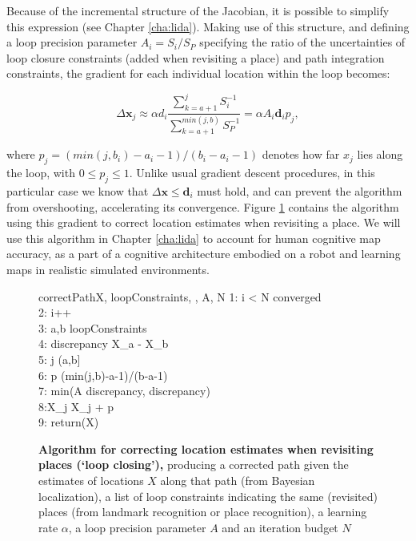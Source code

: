 Because of the incremental structure of the Jacobian, it is possible to simplify this expression (see Chapter \ref{cha:lida}). Making use of this structure, and defining a loop precision parameter $A_i=S_i/S_P$ specifying the ratio of the uncertainties of loop closure constraints (added when revisiting a place) and path integration constraints, the gradient for each individual location within the loop becomes:

\begin{equation}
\label{correction}
\Delta \bm x_j \approx \alpha d_i \frac{\sum_{k=a+1}^{j} S_i^{-1}}{\sum_{k=a+1}^{min(j,b)} S_P^{-1}} = \alpha A_i \bm d_i p_j,
\end{equation}

\noindent where $p_j=(min(j,b_i)-a_i-1)/(b_i-a_i-1)$ denotes how far $x_j$ lies along the loop, with $0 \leq p_j \leq 1$. Unlike usual gradient descent procedures, in this particular case we know that $\Delta \bm x \leq \bm d_i $ must hold, and can prevent the algorithm from overshooting, accelerating its convergence. Figure \ref{fig:sgdslam} contains the algorithm using this gradient to correct location estimates when revisiting a place. We will use this algorithm in Chapter \ref{cha:lida} to account for human cognitive map accuracy, as a part of a cognitive architecture embodied on a robot and learning maps in realistic simulated environments.

\begin{figure}[h]
	\begin{pseudocode}{correctPath}{X, loopConstraints, \alpha, A, N}
		1: \WHILE i < N \AND \NOT converged \\
		2: \quad i++ \\
		3: \quad \FOREACH a,b \in loopConstraints \\
		4: \quad \quad discrepancy \GETS X_a - X_b \\
		5: \quad \quad \FOREACH j \in (a,b] \\
		6: \quad \quad \quad p \GETS (min(j,b)-a-1)/(b-a-1) \\
		7: \quad \quad \quad \beta \GETS min(\alpha A \cdot discrepancy, discrepancy) \\
		8:\quad\quad\quad X_j \GETS X_j + \beta p \\
		9: return(X)
	\end{pseudocode}
	\caption[Algorithm for correcting location estimates when revisiting places]{\textbf{Algorithm for correcting location estimates when revisiting places (`loop closing'),} producing a corrected path given the estimates of locations $X$ along that path (from Bayesian localization), a list of loop constraints indicating the same (revisited) places (from landmark recognition or place recognition), a learning rate $\alpha$, a loop precision parameter $A$ and an iteration budget $N$}
	\label{fig:sgdslam}
\end{figure}


